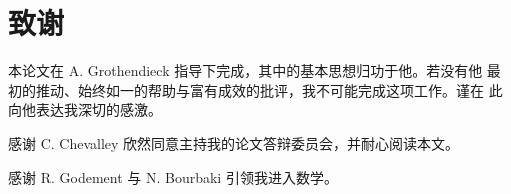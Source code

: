 \chapter*{致谢}

本论文在 A. Grothendieck 指导下完成，其中的基本思想归功于他。若没有他
最初的推动、始终如一的帮助与富有成效的批评，我不可能完成这项工作。谨在
此向他表达我深切的感激。

感谢 C. Chevalley 欣然同意主持我的论文答辩委员会，并耐心阅读本文。

感谢 R. Godement 与 N. Bourbaki 引领我进入数学。
